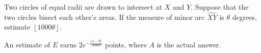 Two circles of equal radii are drawn to intersect at $X$ and $Y$. Suppose that the two circles bisect each other's areas. If the measure of minor arc $\widehat{XY}$ is $\theta$ degrees, estimate $\left\lfloor1000\theta\right\rfloor$.

An estimate of $E$ earns $2e^{-\frac{\left|A-E\right|}{50000}}$ points, where $A$ is the actual answer.